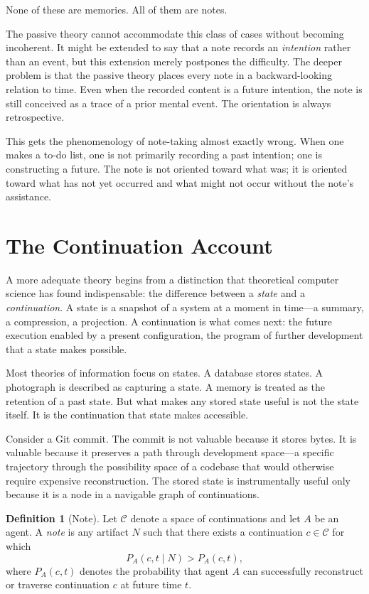 \documentclass[12pt, a4paper, openany]{book}
\theoremstyle{plain}
\theoremstyle{definition}
\newtheorem{definition}[theorem]{Definition}
\theoremstyle{remark}
\newcommand{\calC}{\mathcal{C}}
\begin{document}
None of these are memories. All of them are notes.

The passive theory cannot accommodate this class of cases without becoming
incoherent. It might be extended to say that a note records an \emph{intention}
rather than an event, but this extension merely postpones the difficulty. The
deeper problem is that the passive theory places every note in a backward-looking
relation to time. Even when the recorded content is a future intention, the note
is still conceived as a trace of a prior mental event. The orientation is always
retrospective.

This gets the phenomenology of note-taking almost exactly wrong. When one makes a
to-do list, one is not primarily recording a past intention; one is constructing
a future. The note is not oriented toward what was; it is oriented toward what
has not yet occurred and what might not occur without the note's assistance.

\section{The Continuation Account}

A more adequate theory begins from a distinction that theoretical computer science
has found indispensable: the difference between a \emph{state} and a
\emph{continuation}. A state is a snapshot of a system at a moment in time---a
summary, a compression, a projection. A continuation is what comes next: the
future execution enabled by a present configuration, the program of further
development that a state makes possible.

Most theories of information focus on states. A database stores states. A
photograph is described as capturing a state. A memory is treated as the retention
of a past state. But what makes any stored state useful is not the state itself.
It is the continuation that state makes accessible.

Consider a Git commit. The commit is not valuable because it stores bytes. It is
valuable because it preserves a path through development space---a specific
trajectory through the possibility space of a codebase that would otherwise require
expensive reconstruction. The stored state is instrumentally useful only because
it is a node in a navigable graph of continuations.

\begin{definition}[Note]
Let $\calC$ denote a space of continuations and let $A$ be an agent. A
\emph{note} is any artifact $N$ such that there exists a continuation
$c \in \calC$ for which
\[
P_A(c, t \mid N) > P_A(c, t),
\]
where $P_A(c, t)$ denotes the probability that agent $A$ can successfully
reconstruct or traverse continuation $c$ at future time $t$.
\end{definition}
\end{document}

